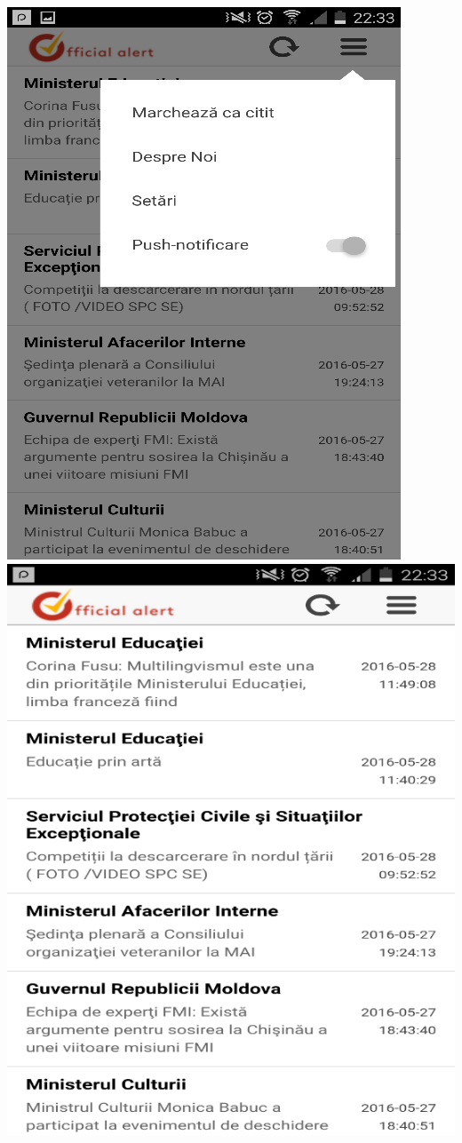 \documentclass[12pt]{article}
\begin{document}
\includegraphics{4.png}
\includegraphics{5.png}\\
\end{document}
